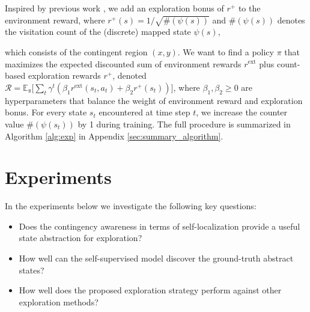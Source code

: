 \documentclass{article} \usepackage{iclr,times}
\begin{document}
Inspired by 
previous work \citep{Bellemare:NIPS2016:UnifyingCount,Tang:NIPS2017:SimHash},
we add an exploration bonus of $r^+$ to the environment reward, where    $r^+(s) = 1  / {\sqrt{\#( \psi(s) )}}$ and
$\#(\psi(s))$ denotes the visitation count of the (discrete) mapped state $\psi(s)$, 
{which consists of the contingent region $(x, y)$.
We want to find a policy $\pi$ that maximizes 
the expected discounted sum of environment rewards $r^\text{ext}$ plus count-based exploration rewards $r^+$, denoted
$\mathcal R = \mathbb{E_\pi}\big[\textstyle \sum_{t} \gamma^t \left(\beta_1 r^\text{ext}(s_t, a_t) + \beta_2 r^+(s_t)\right) \big]
$, where $\beta_1, \beta_2 \ge 0$ are hyperparameters
that balance the weight of environment reward and exploration bonus.
For every state $s_t$ encountered at time step $t$, we increase the counter value $\#(\psi(s_t))$ by 1 during training.
The full procedure is summarized in Algorithm \ref{alg:exp} in Appendix \ref{sec:summary_algorithm}.

\medskip

























 




\vspace*{-5pt}
\section{Experiments}
\label{sec:experiments}
\vspace*{-5pt}

In the experiments below we investigate the following key questions:


\vspace*{-8pt}
\begin{itemize}[leftmargin=7mm]
    \setlength{\itemsep}{0pt}\setlength{\parskip}{0pt}
\item Does the contingency awareness in terms of self-localization provide a useful state abstraction for exploration?
\item How well can the self-supervised model discover the ground-truth abstract states?
\item How well does the proposed exploration strategy perform against other exploration methods?
\end{itemize}
\vspace*{-5pt}




}
\end{document}
